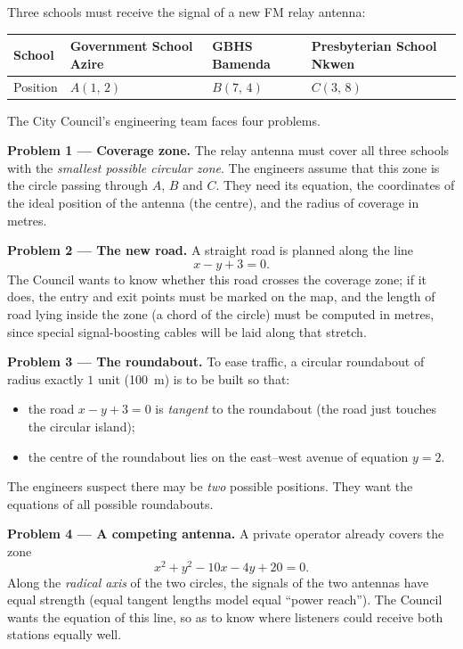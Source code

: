 \documentclass[11pt]{article}
\begin{document}
Three schools must receive the signal of a new FM relay antenna:
\begin{center}
\begin{tabularx}{\linewidth}{|l|X|X|X|}
\hline
\rowcolor{popblueL} School & Government School Azire & GBHS Bamenda & Presbyterian School Nkwen \\
\hline Position & $A(1,\,2)$ & $B(7,\,4)$ & $C(3,\,8)$ \\
\hline
\end{tabularx}
\end{center}

The City Council's engineering team faces four problems.

\textbf{Problem 1 --- Coverage zone.} The relay antenna must cover all three schools with the \emph{smallest possible circular zone}. The engineers assume that this zone is the circle passing through $A$, $B$ and $C$. They need its equation, the coordinates of the ideal position of the antenna (the centre), and the radius of coverage in metres.

\textbf{Problem 2 --- The new road.} A straight road is planned along the line
\[ x-y+3=0. \]
The Council wants to know whether this road crosses the coverage zone; if it does, the entry and exit points must be marked on the map, and the length of road lying inside the zone (a chord of the circle) must be computed in metres, since special signal-boosting cables will be laid along that stretch.

\textbf{Problem 3 --- The roundabout.} To ease traffic, a circular roundabout of radius exactly $1$ unit (\SI{100}{m}) is to be built so that:
\begin{itemize}
\item the road $x-y+3=0$ is \emph{tangent} to the roundabout (the road just touches the circular island);
\item the centre of the roundabout lies on the east--west avenue of equation $y=2$.
\end{itemize}
The engineers suspect there may be \emph{two} possible positions. They want the equations of all possible roundabouts.

\textbf{Problem 4 --- A competing antenna.} A private operator already covers the zone
\[ x^{2}+y^{2}-10x-4y+20=0. \]
Along the \emph{radical axis} of the two circles, the signals of the two antennas have equal strength (equal tangent lengths model equal ``power reach''). The Council wants the equation of this line, so as to know where listeners could receive both stations equally well.
\end{document}

